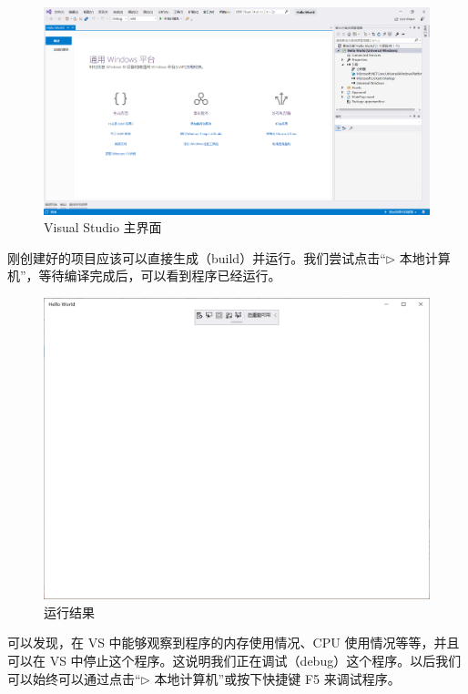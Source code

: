 \begin{figure}[htbp]
    \centering
    \includegraphics[width = 0.75\paperwidth]{pic/6.png}
    \caption{Visual Studio 主界面}
\end{figure}

刚创建好的项目应该可以直接生成（build）并运行。我们尝试点击``{\Large$\triangleright$} 本地计算机''，等待编译完成后，可以看到程序已经运行。

\begin{figure}[htbp]
    \centering
    \includegraphics[width = 0.25\paperwidth]{pic/7.png}
    \caption{运行结果}
\end{figure}

可以发现，在 VS 中能够观察到程序的内存使用情况、CPU 使用情况等等，并且可以在 VS 中停止这个程序。这说明我们正在调试（debug）这个程序。以后我们可以始终可以通过点击``{\Large$\triangleright$} 本地计算机''或按下快捷键 F5 来调试程序。

